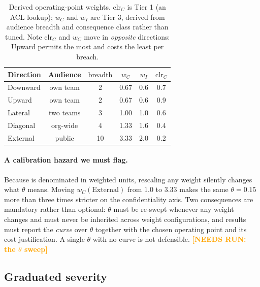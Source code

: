 \documentclass[conference,compsoc]{IEEEtran}
\newcommand{\needsrun}[1]{\textcolor{orange}{\textbf{[NEEDS RUN: #1]}}}
\newcommand{\clr}{\ensuremath{\mathrm{clr}_C}}   %
\newcommand{\wC}{\ensuremath{w_C}}
\newcommand{\wI}{\ensuremath{w_I}}
\begin{document}
\begin{table}[t]
\centering
\caption{Derived operating-point weights. $\clr$ is Tier 1 (an ACL lookup);
$\wC$ and $\wI$ are Tier 3, derived from audience breadth and consequence class
rather than tuned. Note $\clr$ and $\wC$ move in \emph{opposite} directions:
Upward permits the most and costs the least per breach.}
\label{tab:weights}
\footnotesize
\begin{tabular}{@{}lccccc@{}}
\toprule
\textbf{Direction} & \textbf{Audience} & $\mathrm{breadth}$ & $\wC$ & $\wI$ & $\clr$ \\
\midrule
Downward & own team      & 2  & 0.67 & 0.6 & 0.7 \\
Upward   & own team      & 2  & 0.67 & 0.6 & 0.9 \\
Lateral  & two teams     & 3  & 1.00 & 1.0 & 0.6 \\
Diagonal & org-wide      & 4  & 1.33 & 1.6 & 0.4 \\
External & public        & 10 & 3.33 & 2.0 & 0.2 \\
\bottomrule
\end{tabular}
\end{table}

\paragraph{A calibration hazard we must flag.} Because  is
denominated in weighted units, rescaling any weight silently changes what
$\theta$ means. Moving $\wC(\text{External})$ from $1.0$ to $3.33$ makes the
same $\theta=0.15$ more than three times stricter on the confidentiality axis.
Two consequences are mandatory rather than optional: $\theta$ must be re-swept
whenever any weight changes and must never be inherited across weight
configurations, and results must report the \emph{curve} over $\theta$ together
with the chosen operating point and its cost justification. A single $\theta$
with no curve is not defensible. \needsrun{the $\theta$ sweep}

\subsection{Graduated severity}
\label{sec:method:severity}
\end{document}
